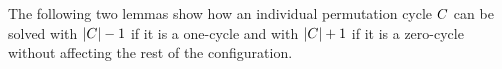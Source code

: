 \documentclass[msc,english,table,xcdraw]{ppgccufmg}
\begin{document}
The following two lemmas show how an individual permutation cycle $C$ can be solved with $|C| - 1$ if it is a one-cycle and with $|C| + 1$ if it is a zero-cycle without affecting the rest of the configuration.




\end{document}
